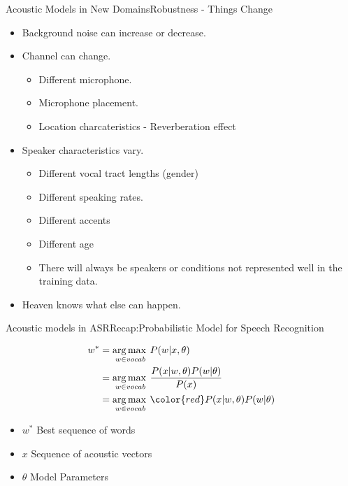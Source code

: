 \begin{frame}{Acoustic Models in New Domains}{Robustness - Things Change}

\begin{itemize}
\item Background noise can increase or decrease.
\item  Channel can change.
\begin{itemize}
  \item Different microphone.
  \item Microphone placement.
  \item Location charcateristics - Reverberation effect
\end{itemize}
\item Speaker characteristics vary.
\begin{itemize}
  \item Different vocal tract lengths (gender)
  \item Different speaking rates.
  \item Different accents
  \item Different age
\item There will always be speakers or conditions not represented well in the training data.
\end{itemize}
\item Heaven knows what else can happen.
\end{itemize}

\end{frame}


\begin{frame} {Acoustic models in ASR}{Recap:Probabilistic Model for Speech Recognition}

\begin{align*}
w^* & = \argmax_{w \in vocab} P(w | x, \theta) \\
       & = \argmax_{w \in vocab} \frac{P(x | w, \theta) P(w | \theta)} { P(x)} \\
       & = \argmax_{w \in vocab} {\color{red} P(x | w, \theta) }  P(w | \theta) \\
\end{align*}

\begin{itemize}
\item $w^*$  Best sequence of words
\item $x$ Sequence of acoustic vectors
\item $\theta$  Model Parameters
\end{itemize}
\end{frame}


